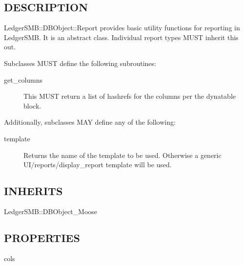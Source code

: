 \begin{description}
\begin{description}
\begin{description}
\begin{description}
\begin{description}
\begin{description}
\begin{description}
\begin{description}
\begin{description}
\begin{description}
\subsection*{DESCRIPTION\label{LedgerSMB::DBObject::Report_DESCRIPTION}}


LedgerSMB::DBObject::Report provides basic utility functions for reporting in
LedgerSMB.  It is an abstract class.  Individual report types MUST inherit this
out.



Subclasses MUST define the following subroutines:

\begin{description}

\item[{get\_columns}] \mbox{}

This MUST return a list of hashrefs for the columns per the dynatable block.

\end{description}


Additionally, subclasses MAY define any of the following:

\begin{description}

\item[{template}] \mbox{}

Returns the name of the template to be used.  Otherwise a generic
UI/reports/display\_report template will be used.

\end{description}
\subsection*{INHERITS\label{LedgerSMB::DBObject::Report_INHERITS}}
\begin{description}

\item[{LedgerSMB::DBObject\_Moose}] \mbox{}\end{description}
\subsection*{PROPERTIES\label{LedgerSMB::DBObject::Report_PROPERTIES}}
\begin{description}

\item[{cols}] \mbox{}


\end{description}
\end{description}
\end{description}
\end{description}
\end{description}
\end{description}
\end{description}
\end{description}
\end{description}
\end{description}
\end{description}
